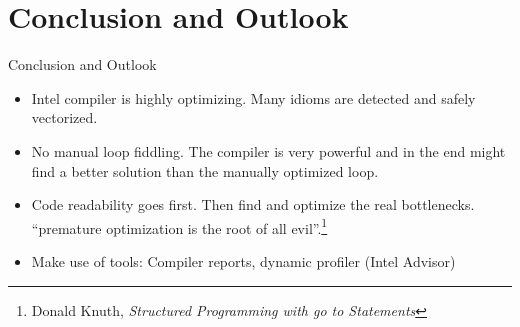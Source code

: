 \section{Conclusion and Outlook}
\begin{frame}{Conclusion and Outlook}
\begin{itemize}
\item Intel compiler is highly optimizing. Many idioms are detected and safely vectorized.
\item No manual loop fiddling. The compiler is very powerful and in the end might find a better solution than the manually optimized loop.
\item Code readability goes first. Then find and optimize the real bottlenecks. \enquote{premature optimization is the root of all evil}.\footnote{Donald Knuth, \textit{Structured Programming with go to Statements}}
\item Make use of tools: Compiler reports, dynamic profiler (Intel Advisor)
\end{itemize}
\end{frame}
